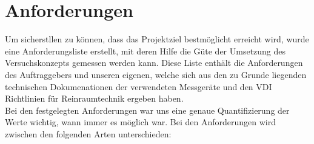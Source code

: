 \section{Anforderungen}
Um sicherstllen zu k\"{o}nnen, dass das Projektziel bestm\"{o}glicht erreicht wird, wurde eine Anforderungsliste erstellt, mit deren Hilfe die G\"{u}te der Umsetzung des Versuchskonzepts gemessen werden kann. Diese Liste enth\"{a}lt die Anforderungen des Auftraggebers und unseren eigenen, welche sich aus den zu Grunde liegenden technischen Dokumenationen der verwendeten Messger\"{a}te und den VDI Richtlinien f\"{u}r Reinraumtechnik ergeben haben.\\
Bei den festgelegten Anforderungen war uns eine genaue Quantifizierung der Werte wichtig, wann immer es m\"{o}glich war. Bei den Anforderungen wird zwischen den folgenden Arten unterschieden:

